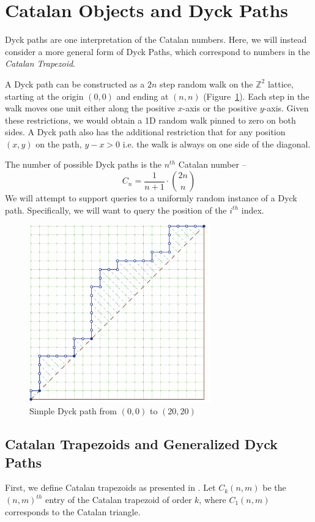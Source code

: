 \section{Catalan Objects and Dyck Paths}%
\label{sec:catalan_objects}

Dyck paths are one interpretation of the Catalan numbers.
Here, we will instead consider a more general form of Dyck Paths, which correspond to numbers in the \textit{Catalan Trapezoid}.

A Dyck path can be constructed as a $2n$ step random walk on the $\mathbb Z^2$ lattice,
starting at the origin $(0,0)$ and ending at $(n, n)$ (Figure~\ref{fig:basic_dyck}).
Each step in the walk moves one unit either along the positive $x$-axis or the positive $y$-axis.
Given these restrictions, we would obtain a 1D random walk pinned to zero  on both sides.
A Dyck path also has the additional restriction that for any position $(x, y)$ on the path, $y-x > 0$
i.e. the walk is always on one side of the diagonal.

The number of possible Dyck paths is the $n^{th}$ Catalan number --
$$C_n = \frac{1}{n+1}\cdot {2n\choose n}$$
We will attempt to support queries to a uniformly random instance of a Dyck path.
Specifically, we will want to query the position of the $i^{th}$ index.

\begin{figure}[htbp]
    \centering
    \includegraphics[width=0.7\textwidth]{dyck/basic_dyck_path.pdf}
    \caption{Simple Dyck path from $(0, 0)$ to $(20, 20)$}
    \label{fig:basic_dyck}
\end{figure}


\subsection{Catalan Trapezoids and Generalized Dyck Paths}
First, we define Catalan trapezoids as presented in \cite{trap}.
Let $C_k(n,m)$ be the $(n,m)^{th}$ entry of the Catalan trapezoid of order $k$, where $C_1(n,m)$ corresponds to the Catalan triangle.

